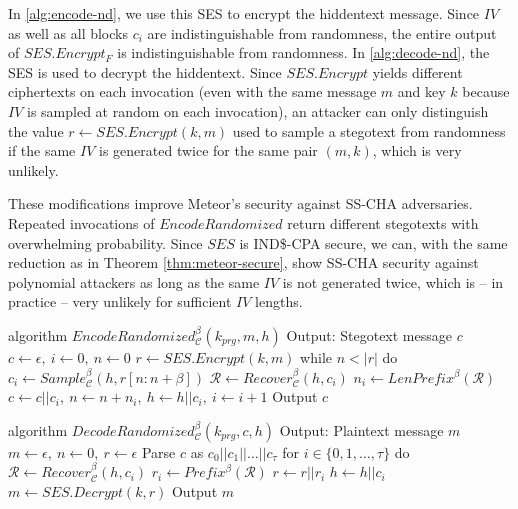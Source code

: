In \autoref{alg:encode-nd}, we use this SES to encrypt the hiddentext message.
Since $IV$ as well as all blocks $c_i$ are indistinguishable from randomness, the entire output of $SES.Encrypt_F$ is indistinguishable from randomness.
In \autoref{alg:decode-nd}, the SES is used to decrypt the hiddentext.
Since $SES.Encrypt$ yields different ciphertexts on each invocation (even with the same message $m$ and key $k$ because $IV$ is sampled at random on each invocation), an attacker can only distinguish the value $r \leftarrow SES.Encrypt(k,m)$ used to sample a stegotext from randomness if the same $IV$ is generated twice for the same pair $(m,k)$, which is very unlikely.

These modifications improve Meteor's security against SS-CHA adversaries.
Repeated invocations of $EncodeRandomized$ return different stegotexts with overwhelming probability.
Since $SES$ is IND\$-CPA secure, we can, with the same reduction as in Theorem \ref{thm:meteor-secure}, show SS-CHA security against polynomial attackers as long as the same $IV$ is not generated twice, which is -- in practice -- very unlikely for sufficient $IV$ lengths.


\begin{Pseudocode}[float, caption={
$EncodeRandomized$ algorithm.
This algorithm differs from the original $Encode$ algorithm by using $SES$ to encrypt the message.
The ciphertext (which is indistinguishable from randomness and nondeterministic) is then used to sample from $\mathcal{C}_h$.
}, label={alg:encode-nd}]
algorithm $EncodeRandomized_{\mathcal{C}}^{\beta}(k_{prg}, m, h)$
  Output: Stegotext message $c$
  $c \leftarrow \epsilon,~ i \leftarrow 0,~ n \leftarrow 0$
  $r \leftarrow SES.Encrypt(k, m)$
  while $n < |r|$ do
    $c_i \leftarrow Sample_{\mathcal{C}}^\beta(h, r[n: n+\beta])$
    $\mathcal{R} \leftarrow Recover_{\mathcal{C}}^\beta(h, c_i)$
    $n_i \leftarrow LenPrefix^\beta(\mathcal{R})$
    $c \leftarrow c || c_i,~ n \leftarrow n+n_i,~ h \leftarrow h||c_i,~ i \leftarrow i + 1$
  Output $c$
\end{Pseudocode}
\begin{Pseudocode}[float, caption={
$DecodeRandomized$ algorithm.
This algorithm differs from the original $Decode$ algorithm by using $SES$ to decrypt the stegotext.
}, label={alg:decode-nd}]
algorithm $DecodeRandomized_{\mathcal{C}}^{\beta}(k_{prg}, c, h)$
  Output: Plaintext message $m$
  $m \leftarrow \epsilon,~ n \leftarrow 0,~ r \leftarrow \epsilon$
  Parse $c$ as $c_0 || c_1 || \dots || c_{\tau}$
  for $i \in \{ 0, 1, \dots, \tau \}$ do
    $\mathcal{R} \leftarrow Recover_{\mathcal{C}}^\beta(h, c_i)$
    $r_i \leftarrow Prefix^\beta(\mathcal{R})$
    $r \leftarrow r || r_i$
    $h \leftarrow h||c_i$
  $m \leftarrow SES.Decrypt(k, r)$
  Output $m$
\end{Pseudocode}